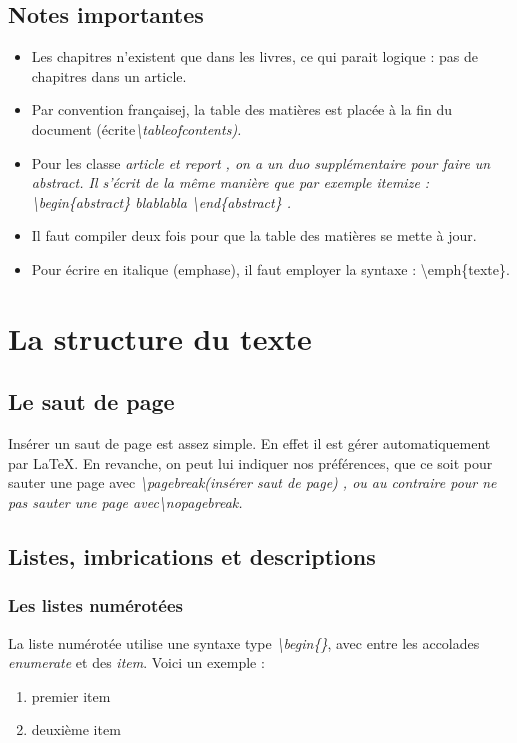 \documentclass[a4paper,  10pt]{book}
\begin{document}
\section{Notes importantes}
\begin{itemize}

\item Les chapitres n'existent que dans les livres, ce qui parait logique : pas de chapitres dans un article.
\item Par convention françaisej, la table des matières est placée à la fin du document (écrite\em\textbackslash tableofcontents\em).
\item Pour les classe \em article \em et \em report \em , on a un duo supplémentaire pour faire un abstract. Il s'écrit de la même manière que par exemple \em itemize \em : \textbackslash begin\{abstract\} blablabla \textbackslash end\{abstract\} .
\item Il faut compiler deux fois pour que la table des matières se mette à jour.
\item Pour écrire en italique (emphase), il faut employer la syntaxe : \textbackslash emph\{texte\}.

\end{itemize}

\nopagebreak

\chapter{La structure du texte}
\section{Le saut de page}
Insérer un saut de page est assez simple. En effet il est gérer automatiquement par \LaTeX . En revanche, on peut lui indiquer nos préférences, que ce soit pour sauter une page avec \em \textbackslash pagebreak\em (insérer saut de page) , ou au contraire pour ne pas sauter une page avec\em \textbackslash nopagebreak\em .

\section{Listes, imbrications et descriptions}
\subsection{Les listes numérotées}

La liste numérotée utilise une syntaxe type \emph{\textbackslash begin\{\}}, avec entre les accolades \emph{enumerate} et des \emph{item}.
Voici un exemple :
\begin{enumerate}

\item premier item
\item deuxième item

\end{enumerate}	
\end{document}
